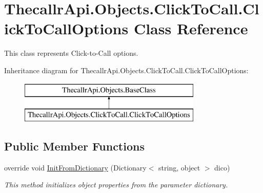 \hypertarget{class_thecallr_api_1_1_objects_1_1_click_to_call_1_1_click_to_call_options}{\section{Thecallr\+Api.\+Objects.\+Click\+To\+Call.\+Click\+To\+Call\+Options Class Reference}
\label{class_thecallr_api_1_1_objects_1_1_click_to_call_1_1_click_to_call_options}
}


This class represents Click-\/to-\/\+Call options.  


Inheritance diagram for Thecallr\+Api.\+Objects.\+Click\+To\+Call.\+Click\+To\+Call\+Options\+:\begin{figure}[H]
\begin{center}
\leavevmode
\includegraphics[height=2.000000cm]{class_thecallr_api_1_1_objects_1_1_click_to_call_1_1_click_to_call_options}
\end{center}
\end{figure}
\subsection*{Public Member Functions}
\begin{DoxyCompactItemize}
\item 
override void \hyperlink{class_thecallr_api_1_1_objects_1_1_click_to_call_1_1_click_to_call_options_ab4bc886caf22406d3f0f27469a707ccc}{Init\+From\+Dictionary} (Dictionary$<$ string, object $>$ dico)
\begin{DoxyCompactList}\small\item\em This method initializes object properties from the parameter dictionary. \end{DoxyCompactList}\end{DoxyCompactItemize}
